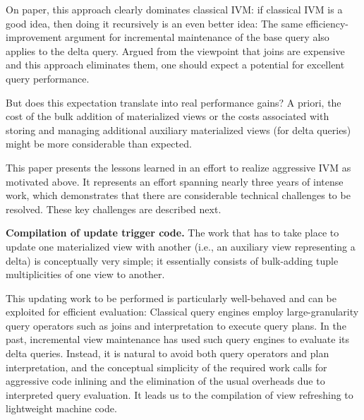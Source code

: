 
On paper, this approach clearly dominates classical IVM: if classical IVM is a good idea, then doing it recursively is an even better idea: The same efficiency-improvement argument for incremental maintenance of the base query also applies to the delta query. Argued from the viewpoint that joins are expensive and this approach eliminates them, one should expect a potential for excellent query performance.

But does this expectation translate into real performance gains? A priori, the cost of the bulk addition of materialized views or the costs associated with storing and managing additional auxiliary materialized views (for delta queries) might be more considerable than expected.


\medskip


This paper presents the lessons learned in an effort to realize aggressive IVM as motivated above. It represents an effort spanning nearly three years of intense work, which demonstrates that there are considerable technical challenges to be resolved. These key challenges are described next.

{\bf Compilation of update trigger code.}
%
The work that has to take place to update one materialized view with another (i.e., an auxiliary view representing a delta) is conceptually very simple; it essentially consists of bulk-adding tuple multiplicities of one view to another.

This updating work to be performed is particularly well-behaved and can be exploited for efficient evaluation:
Classical query engines employ large-granularity query operators such as joins and interpretation to execute query plans. In the past, incremental view maintenance has used such query engines to evaluate its delta queries.
Instead, it is natural to avoid both query operators and plan interpretation, and the conceptual simplicity of the required work calls for aggressive code inlining and the elimination of the usual overheads due to interpreted query evaluation. It leads us to the compilation of view refreshing to lightweight machine code.


